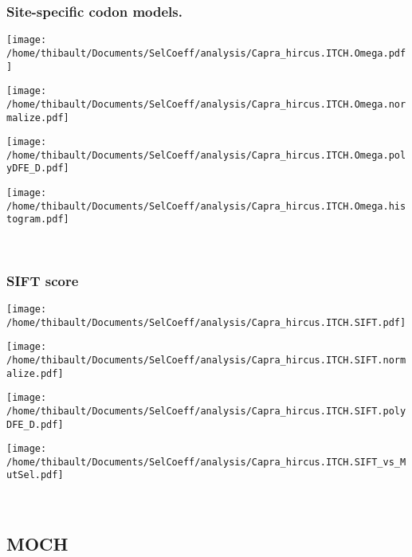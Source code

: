 \subsubsection*{Site-specific codon models.} 
\begin{minipage}{0.49\linewidth} 
\texttt{[image: /home/thibault/Documents/SelCoeff/analysis/Capra\_hircus.ITCH.Omega.pdf]} 
\end{minipage}
\begin{minipage}{0.49\linewidth} 
\texttt{[image: /home/thibault/Documents/SelCoeff/analysis/Capra\_hircus.ITCH.Omega.normalize.pdf]} 
\end{minipage}
\begin{minipage}{0.49\linewidth} 
\texttt{[image: /home/thibault/Documents/SelCoeff/analysis/Capra\_hircus.ITCH.Omega.polyDFE\_D.pdf]} 
\end{minipage}
\begin{minipage}{0.49\linewidth} 
\texttt{[image: /home/thibault/Documents/SelCoeff/analysis/Capra\_hircus.ITCH.Omega.histogram.pdf]} 
\end{minipage}
\\ 
\subsubsection*{SIFT score} 
\begin{minipage}{0.49\linewidth} 
\texttt{[image: /home/thibault/Documents/SelCoeff/analysis/Capra\_hircus.ITCH.SIFT.pdf]} 
\end{minipage}
\begin{minipage}{0.49\linewidth} 
\texttt{[image: /home/thibault/Documents/SelCoeff/analysis/Capra\_hircus.ITCH.SIFT.normalize.pdf]} 
\end{minipage}
\begin{minipage}{0.49\linewidth} 
\texttt{[image: /home/thibault/Documents/SelCoeff/analysis/Capra\_hircus.ITCH.SIFT.polyDFE\_D.pdf]} 
\end{minipage}
\begin{minipage}{0.49\linewidth} 
\texttt{[image: /home/thibault/Documents/SelCoeff/analysis/Capra\_hircus.ITCH.SIFT\_vs\_MutSel.pdf]} 
\end{minipage}
\\ 
\subsection{MOCH} 
 
